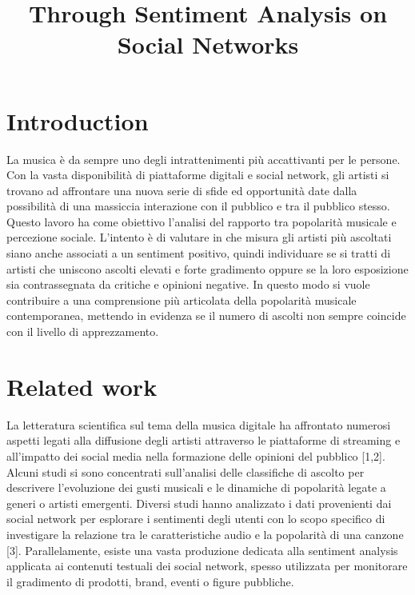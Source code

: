 \documentclass[conference]{IEEEtran}
\begin{document}
\title{Through Sentiment Analysis on Social Networks}


\author{
}

\maketitle

\begin{abstract}

\end{abstract}

\section{Introduction}\label{sec:intro}

La musica è da sempre uno degli intrattenimenti più accattivanti per le persone. Con
la vasta disponibilità di piattaforme digitali e social network, gli artisti si trovano
ad affrontare una nuova serie di sfide ed opportunità date dalla possibilità di una
massiccia interazione con il pubblico e tra il pubblico stesso. Questo lavoro ha
come obiettivo l'analisi del rapporto tra popolarità musicale e percezione sociale.
L'intento è di valutare in che misura gli artisti più ascoltati siano anche associati
a un sentiment positivo, quindi individuare se si tratti di artisti che uniscono ascolti
elevati e forte gradimento oppure se la loro esposizione sia contrassegnata da critiche
e opinioni negative. In questo modo si vuole contribuire a una comprensione più articolata
della popolarità musicale contemporanea, mettendo in evidenza se il numero di ascolti non
sempre coincide con il livello di apprezzamento.

\section{Related work}\label{sec:relwork}

La letteratura scientifica sul tema della musica digitale ha affrontato numerosi aspetti
legati alla diffusione degli artisti attraverso le piattaforme di streaming e all'impatto
dei social media nella formazione delle opinioni del pubblico [1,2]. Alcuni studi si sono
concentrati sull'analisi delle classifiche di ascolto per descrivere l'evoluzione dei
gusti musicali e le dinamiche di popolarità legate a generi o artisti emergenti. Diversi
studi hanno analizzato i dati provenienti dai social network per esplorare i sentimenti
degli utenti con lo scopo specifico di investigare la relazione tra le caratteristiche
audio e la popolarità di una canzone [3]. Parallelamente, esiste una vasta produzione
dedicata alla sentiment analysis applicata ai contenuti testuali dei social network,
spesso utilizzata per monitorare il gradimento di prodotti, brand, eventi o figure pubbliche.
\end{document}
